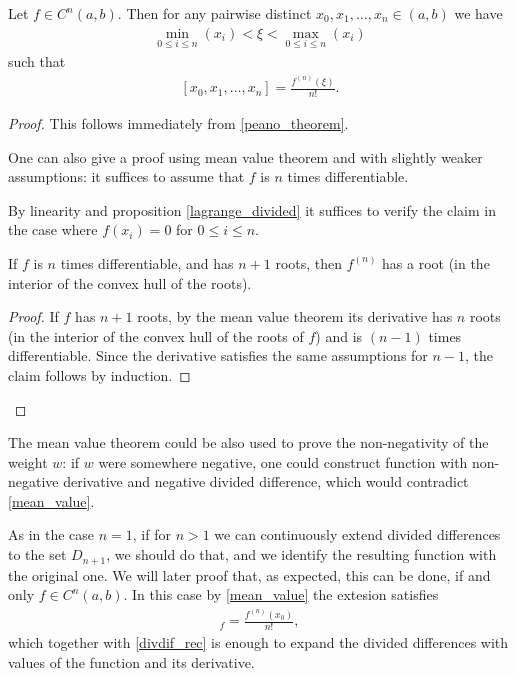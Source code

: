 \begin{lause}
	Let $f \in C^{n}(a, b)$. Then for any pairwise distinct $x_{0}, x_{1}, \ldots, x_{n} \in (a, b)$ we have
	\begin{align*}
		\min_{0 \leq i \leq n}(x_{i}) < \xi < \max_{0 \leq i \leq n}(x_{i})
	\end{align*}
	such that
	\begin{align}\label{mean_value}
		[x_{0}, x_{1}, \ldots, x_{n}] = \frac{f^{(n)}(\xi)}{n!}.
	\end{align}
\end{lause}
\begin{proof}
	This follows immediately from \ref{peano_theorem}.

	One can also give a proof using mean value theorem and with slightly weaker assumptions: it suffices to assume that $f$ is $n$ times differentiable.

	By linearity and proposition \ref{lagrange_divided} it suffices to verify the claim in the case where $f(x_{i}) = 0$ for $0 \leq i \leq n$.

	\begin{lem}
		If $f$ is $n$ times differentiable, and has $n + 1$ roots, then $f^{(n)}$ has a root (in the interior of the convex hull of the roots).
	\end{lem}
	\begin{proof}
		If $f$ has $n + 1$ roots, by the mean value theorem its derivative has $n$ roots (in the interior of the convex hull of the roots of $f$) and is $(n - 1)$ times differentiable. Since the derivative satisfies the same assumptions for $n - 1$, the claim follows by induction.
	\end{proof}
\end{proof}

The mean value theorem could be also used to prove the non-negativity of the weight $w$: if $w$ were somewhere negative, one could construct function with non-negative derivative and negative divided difference, which would contradict \ref{mean_value}.

As in the case $n = 1$, if for $n > 1$ we can continuously extend divided differences to the set $D_{n + 1}$, we should do that, and we identify the resulting function with the original one. We will later proof that, as expected, this can be done, if and only $f \in C^{n}(a, b)$. In this case by \ref{mean_value} the extesion satisfies
\begin{align*}
	[x_{0}, x_{0}, \ldots, x_{0}]_{f} = \frac{f^{(n)}(x_{0})}{n!},
\end{align*}
which together with \ref{divdif_rec} is enough to expand the divided differences with values of the function and its derivative.

